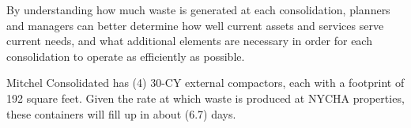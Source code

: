 
    By understanding how much waste is generated at each consolidation, planners and managers
    can better determine how well current assets and services serve current needs, and what additional 
    elements are necessary in order for each consolidation to operate as efficiently as possible. 

    Mitchel Consolidated has (4) 30-CY external compactors, each with a footprint of 192 square feet. Given the rate at which waste is produced at NYCHA properties, these containers will fill
    up in about (6.7) days.